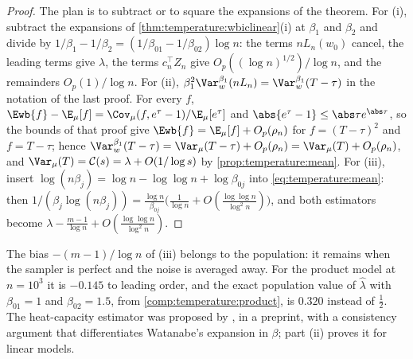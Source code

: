 \begin{refsection}

\begin{proof}
The plan is to subtract or to square the expansions of the theorem. For (i), subtract the expansions of \cref{thm:temperature:wbiclinear}(i) at $\beta_1$ and $\beta_2$ and divide by $1/\beta_1-1/\beta_2=(1/\beta_{01}-1/\beta_{02})\log n$: the terms $nL_n(w_0)$ cancel, the leading terms give $\lambda$, the terms $c_n^\top Z_n$ give $O_p((\log n)^{1/2})/\log n$, and the remainders $O_p(1)/\log n$. For (ii), $\beta_1^2\Var^{\beta_1}_w(nL_n)=\Var^{\beta_1}_w(T-\tau)$ in the notation of the last proof. For every $f$, $\Ewb{f}-\E_\mu[f]=\Cov_\mu(f,e^\tau-1)/\E_\mu[e^\tau]$ and $\abs{e^\tau-1}\le\abs\tau e^{\abs\tau}$, so the bounds of that proof give $\Ewb{f}=\E_\mu[f]+O_p(\rho_n)$ for $f=(T-\tau)^2$ and $f=T-\tau$; hence $\Var^{\beta_1}_w(T-\tau)=\Var_\mu(T-\tau)+O_p(\rho_n)=\Var_\mu(T)+O_p(\rho_n)$, and $\Var_\mu(T)=\temperatureC(s)=\lambda+O(1/\log s)$ by \cref{prop:temperature:mean}. For (iii), insert $\log(n\beta_j)=\log n-\log\log n+\log\beta_{0j}$ into \eqref{eq:temperature:mean}: then $1/(\beta_j\log(n\beta_j))=\frac{\log n}{\beta_{0j}}\bigl(\frac1{\log n}+O(\frac{\log\log n}{\log^2n})\bigr)$, and both estimators become $\lambda-\frac{m-1}{\log n}+O(\frac{\log\log n}{\log^2n})$.
\end{proof}

The bias $-(m-1)/\log n$ of (iii) belongs to the population: it remains when the sampler is perfect and the noise is averaged away. For the product model at $n=10^3$ it is $-0.145$ to leading order, and the exact population value of $\hat\lambda$ with $\beta_{01}=1$ and $\beta_{02}=1.5$, from \cref{comp:temperature:product}, is $0.320$ instead of $\frac12$. The heat-capacity estimator was proposed by \textcite{Imai2019a}, in a preprint, with a consistency argument that differentiates Watanabe's expansion in $\beta$; part (ii) proves it for linear models.


\end{refsection}
